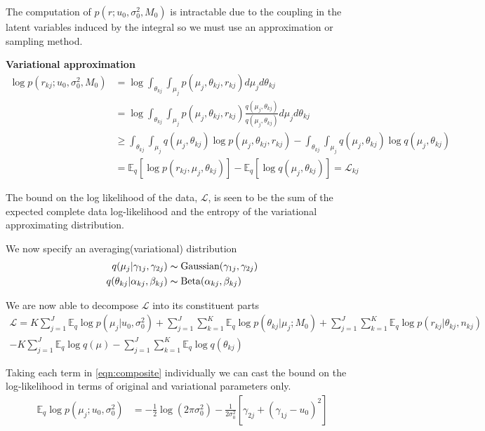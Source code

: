\documentclass[10pt, letterpaper]{article}
\newcommand{\E}{\mathbb{E}}
\begin{document}
The computation of $p(r;u_0,\sigma_0^2,M_0)$ is intractable due to the coupling in the latent variables induced by the integral so we must use an approximation or sampling method.

{\bf Variational approximation}
\begin{align}
\log p(r_{kj}; u_0, \sigma_0^2, M_0) & = \log \int_{\theta_{kj}} \int_{\mu_j} p(\mu_j, \theta_{kj}, r_{kj})d\mu_jd\theta_{kj} \\
& = \log \int_{\theta_{kj}} \int_{\mu_j} p(\mu_j, \theta_{kj}, r_{kj}) \frac{q(\mu_j, \theta_{kj})}{q(\mu_j, \theta_{kj})}  d\mu_jd\theta_{kj}\\
& \geq  \int_{\theta_{kj}} \int_{\mu_j} q(\mu_j, \theta_{kj}) \log p(\mu_j, \theta_{kj}, r_{kj}) -  \int_{\theta_{kj}} \int_{\mu_j} q(\mu_j, \theta_{kj}) \log q(\mu_j, \theta_{kj}) \\
& = \E_q \left[ \log p(r_{kj}, \mu_j, \theta_{kj}) \right] - \E_q\left[ \log q(\mu_j, \theta_{kj}) \right] = \mathcal{L}_{kj}
\end{align}

The bound on the log likelihood of the data, $\mathcal{L}$, is seen to be the sum of the expected complete data log-likelihood and the entropy of the variational approximating distribution.

We now specify an averaging(variational) distribution
\begin{align}
q(\mu_j | \gamma_{1j}, \gamma_{2j}) & \thicksim \text{Gaussian}(\gamma_{1j}, \gamma_{2j})\\
q(\theta_{kj} | \alpha_{kj}, \beta_{kj} ) & \thicksim \text{Beta}(\alpha_{kj}, \beta_{kj})
\end{align}

We are now able to decompose $\mathcal{L}$ into its constituent parts
\begin{multline}\label{eqn:composite}
\mathcal{L} = K\sum_{j=1}^J \E_q\log p(\mu_j|u_0,\sigma_0^2) + \sum_{j=1}^J\sum_{k=1}^K\E_q \log p(\theta_{kj} | \mu_j; M_0) 
+ \sum_{j=1}^J\sum_{k=1}^K\E_q \log p(r_{kj} | \theta_{kj}, n_{kj})\\
- K\sum_{j=1}^J\E_q \log q(\mu) - \sum_{j=1}^J\sum_{k=1}^K \E_q \log q(\theta_{kj})
\end{multline}

Taking each term in \eqref{eqn:composite} individually we can cast the bound on the log-likelihood in terms of original and variational parameters only.
\begin{align}
\E_q \log p(\mu_j ; u_0, \sigma_0^2) & = -\frac{1}{2}\log (2\pi\sigma_0^2) -\frac{1}{2\sigma_0^2}\left[ \gamma_{2j} + (\gamma_{1j} - u_0)^2 \right]
\end{align}
\end{document}
